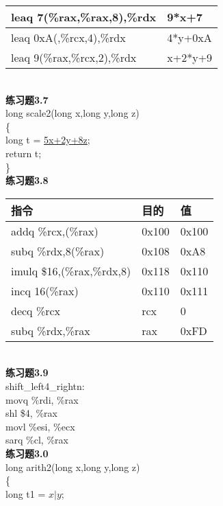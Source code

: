 \documentclass{article}
\begin{document}
\begin{CJK}{UTF8}{uyhei}
\begin{table}[htbp]
\begin{tabular}{|m{18em}<{\centering}|m{10em}<{\centering}|}
	\hline
	leaq 7(\%rax,\%rax,8),\%rdx	&	9*x+7	\\
	\hline
	leaq 0xA(,\%rcx,4),\%rdx	&	4*y+0xA	\\
	\hline
	leaq 9(\%rax,\%rcx,2),\%rdx	&	x+2*y+9	\\
	\hline
\end{tabular}
\end{table}	\\[2ex]
\textbf{练习题3.7}	\\[2ex]
long scale2(long x,long y,long z)	\\
\{	\\
	long t = \underline{5x+2y+8z};	\\
	return t;	\\
\}	\\[3ex]
\textbf{练习题3.8}	\\[2ex]
\begin{table}[htbp]
\centering
\begin{tabular}{|m{18em}<{\centering}|m{10em}<{\centering}|m{10em}<{\centering}|}
	\hline
	指令	&	目的	&	值	\\
	\hline
	addq \%rcx,(\%rax)	&	0x100	&	0x100	\\
	\hline
	subq \%rdx,8(\%rax)	&	0x108	&	0xA8	\\
	\hline
	imulq \$16,(\%rax,\%rdx,8)	&	0x118	&	0x110	\\
	\hline
	incq 16(\%rax)	&	0x110	&	0x111	\\
	\hline
	decq \%rcx	&	rcx	&	0	\\
	\hline
	subq \%rdx,\%rax	&	rax	&	0xFD	\\
	\hline
\end{tabular}
\end{table}	\\[2ex]
\newpage
\noindent\textbf{练习题3.9}	\\[2ex]
shift\_left4\_rightn:	\\
\hspace*{1em} movq \%rdi, \%rax	\\
\hspace*{1em} shl \$4, \%rax	\\
\hspace*{1em} movl \%esi, \%ecx	\\
\hspace*{1em} sarq \%cl, \%rax	\\[3ex]
\textbf{练习题3.0}	\\[2ex]
long arith2(long x,long y,long z)	\\
\{	\\
\hspace*{2em}	long t1 = \underline{$x | y$};	\\

\end{CJK}
\end{document}
